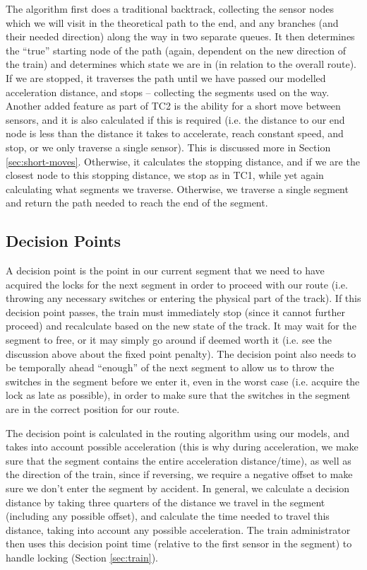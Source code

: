 \documentclass[12pt, titlepage]{article}
\begin{document}
    The algorithm first does a traditional backtrack, collecting the sensor nodes which we will visit in the theoretical path to the end, and any branches (and their needed direction) along the way in two separate queues. It then determines the ``true'' starting node of the path (again, dependent on the new direction of the train) and determines which state we are in (in relation to the overall route). If we are stopped, it traverses the path until we have passed our modelled acceleration distance, and stops -- collecting the segments used on the way. Another added feature as part of TC2 is the ability for a short move between sensors, and it is also calculated if this is required (i.e. the distance to our end node is less than the distance it takes to accelerate, reach constant speed, and stop, or we only traverse a single sensor). This is discussed more in Section \ref{sec:short-moves}. Otherwise, it calculates the stopping distance, and if we are the closest node to this stopping distance, we stop as in TC1, while yet again calculating what segments we traverse. Otherwise, we traverse a single segment and return the path needed to reach the end of the segment.
    
    \subsection{Decision Points}
    \label{sec:decision-pts}
    
    A decision point is the point in our current segment that we need to have acquired the locks for the next segment in order to proceed with our route (i.e. throwing any necessary switches or entering the physical part of the track). If this decision point passes, the train must immediately stop (since it cannot further proceed) and recalculate based on the new state of the track. It may wait for the segment to free, or it may simply go around if deemed worth it (i.e. see the discussion above about the fixed point penalty). The decision point also needs to be temporally ahead ``enough'' of the next segment to allow us to throw the switches in the segment before we enter it, even in the worst case (i.e. acquire the lock as late as possible), in order to make sure that the switches in the segment are in the correct position for our route. 
    
    The decision point is calculated in the routing algorithm using our models, and takes into account possible acceleration (this is why during acceleration, we make sure that the segment contains the entire acceleration distance/time), as well as the direction of the train, since if reversing, we require a negative offset to make sure we don't enter the segment by accident. In general, we calculate a decision distance by taking three quarters of the distance we travel in the segment (including any possible offset), and calculate the time needed to travel this distance, taking into account any possible acceleration. The train administrator then uses this decision point time (relative to the first sensor in the segment) to handle locking (Section \ref{sec:train}).
    
\end{document}
